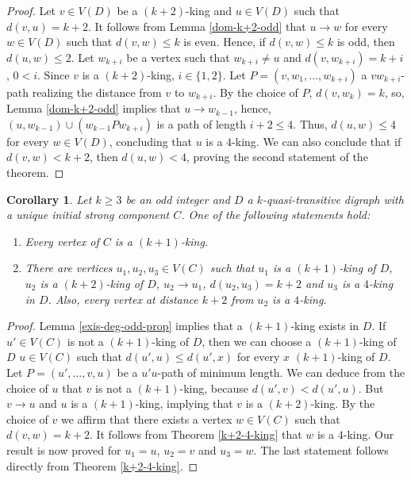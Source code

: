 \documentclass[preprint]{elsarticle}
\newtheorem{cor}[thm]{Corollary}
\begin{document}
\begin{proof}
Let $v \in V(D)$ be a $(k+2)$-king and $u \in V(D)$ such that $d(v,u) = k+2$.   It follows from Lemma \ref{dom-k+2-odd} that $u \to w$ for every $w \in V(D)$ such that $d(v,w) \le k$ is even.   Hence, if $d(v,w) \le k$ is odd, then $d(u,w) \le 2$.   Let $w_{k+i}$ be a vertex such that $w_{k+i} \ne u$ and $d(v, w_{k+i}) = k+i$, $0 < i$.  Since $v$ is a $(k+2)$-king, $i \in \{ 1, 2 \}$.   Let $P = (v, w_1, \dots, w_{k+i})$ a $v w_{k+i}$-path realizing the distance from $v$ to $w_{k+i}$.   By the choice of $P$, $d(v, w_k) = k$, so, Lemma \ref{dom-k+2-odd} implies that $u \to w_{k-1}$, hence, $(u, w_{k-1}) \cup (w_{k-1} P w_{k+i})$ is a path of length $i + 2 \le 4$.   Thus, $d(u,w) \le 4$ for every $w \in V(D)$, concluding that $u$ is a $4$-king.   We can also conclude that if $d(v,w) < k+2$, then $d(u,w) < 4$, proving the second statement of the theorem.
\end{proof}

\begin{cor} \label{odd-k+1-4-fin}
Let $k \ge 3$ be an odd integer and $D$ a $k$-quasi-transitive digraph with a unique initial strong component $C$.   One of the following statements hold:

\begin{enumerate}
	\item Every vertex of $C$ is a $(k+1)$-king.
	
	\item There are vertices $u_1, u_2, u_3 \in V(C)$ such that $u_1$ is a $(k+1)$-king of $D$, $u_2$ is a $(k+2)$-king of $D$, $u_2 \to u_1$, $d(u_2, u_3) = k+2$ and
	 $u_3$ is a $4$-king in $D$.   Also, every vertex at distance $k+2$ from $u_2$ is a $4$-king.
\end{enumerate}
\end{cor}

\begin{proof}
Lemma \ref{exis-deg-odd-prop} implies that a $(k+1)$-king exists in $D$.   If $u' \in V(C)$ is not a $(k+1)$-king of $D$, then we can choose a $(k+1)$-king of $D$ $u \in V(C)$ such that $d(u',u) \le d(u',x)$ for every $x$ $(k+1)$-king of $D$.   Let $P = (u', \dots, v,u)$ be a $u'u$-path of minimum length.   We can deduce from the choice of $u$ that $v$ is not a $(k+1)$-king, because $d(u', v) < d(u', u)$.   But $v \to u$ and $u$ is a $(k+1)$-king, implying that $v$ is a $(k+2)$-king.   By the choice of $v$ we affirm that there exists a vertex $w \in V(C)$ such that $d(v,w) = k+2$.   It follows from Theorem \ref{k+2-4-king} that $w$ is a $4$-king.   Our result is now proved for $u_1 = u$, $u_2 = v$ and $u_3 = w$.   The last statement follows directly from Theorem \ref{k+2-4-king}.
\end{proof}
\end{document}
